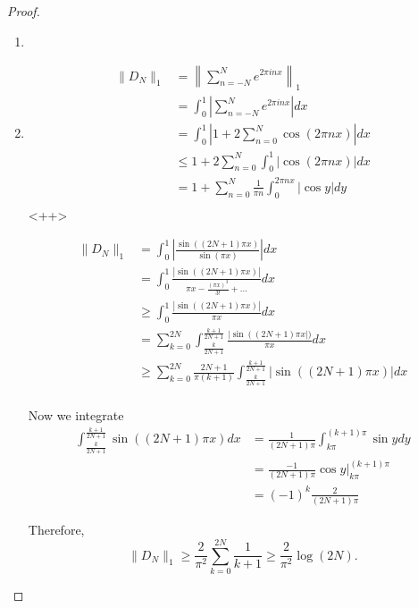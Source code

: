 \documentclass[a4paper]{article}
\begin{document}
\begin{enumerate}
\begin{proof}
\begin{enumerate}
    \item

    \item
      \begin{align*}
        \| D_N \|_1 &= \left\| \sum_{n = -N}^N e^{2 \pi i n x} \right\|_1 \\
        &= \int_{0}^{1} \left| \sum_{n=-N}^N e^{2 \pi i n x} \right| dx \\
        &= \int_{0}^{1} \left| 1 + 2 \sum_{n = 0}^N \cos( 2 \pi n x) \right| dx \\
        &\leq 1 + 2 \sum_{n = 0}^N \int_{0}^{1} \left| \cos(2 \pi n x) \right| dx \\
        &= 1 + \sum_{n=0}^N \frac{1}{\pi n} \int_{0}^{2 \pi n x} | \cos y | dy \\
      \end{align*}<++>

      \begin{align*}
        \| D_N \|_1 &= \int_{0}^{1} \left| \frac{\sin \left( (2N+1) \pi x \right)}{\sin (\pi x)} \right| dx \\
        &= \int_{0}^{1} \frac{ | \sin \left( ( 2N+1 ) \pi x \right) |}{ \pi x - \frac{(\pi x)^3}{3!} + \dots} dx \\
        &\geq \int_{0}^{1} \frac{| \sin \left( ( 2N+1 ) \pi x \right) |}{\pi x} dx \\
        &= \sum_{k=0}^{2N} \int_{\frac{k}{2N+1}}^{\frac{k+1}{2N+1}} \frac{| \sin \left( ( 2N+1 ) \pi x \right |)}{\pi x} dx \\
        &\geq \sum_{k = 0}^{2N} \frac{2N+1}{\pi (k+1)} \int_{\frac{k}{2N+1}}^{\frac{k+1}{2N+1}} | \sin \left( (2N+1) \pi x \right) | dx \\
      \end{align*}

      Now we integrate
      \begin{align*}
        \int_{\frac{k}{2N+1}}^{\frac{k+1}{2N+1}} \sin \left( (2N+1) \pi x \right) dx &= \frac{1}{(2N+1)\pi} \int_{k \pi}^{ (k+1) \pi } \sin y dy \\
        &= \frac{-1}{(2N+1) \pi} \cos y \big|_{k\pi}^{(k+1)\pi} \\
        &= (-1)^k \frac{2}{(2N+1) \pi}
      \end{align*}

      Therefore,
      \[ \| D_N \|_1 \geq \frac{2}{\pi^2} \sum_{k=0}^{2N} \frac{1}{k+1} \geq \frac{2}{\pi^2} \log (2N) .\]

  \end{enumerate}


\end{proof}
\end{enumerate}
\end{document}
